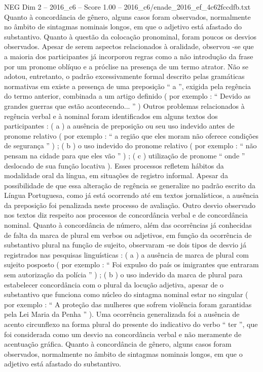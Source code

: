 \begin{textsample}{NEG Dim 2 – 2016\_c6 – Score 1.00 – 2016\_c6/enade\_2016\_ef\_4c62fccdfb.txt}
Quanto à concordância de gênero, alguns casos foram observados, normalmente no âmbito de sintagmas nominais longos, em que o adjetivo está afastado do substantivo.
Quanto à questão da colocação pronominal, foram poucos os desvios observados.
Apesar de serem aspectos relacionados à oralidade, observou -se que a maioria dos participantes já incorporou regras como a não introdução da frase por um pronome oblíquo e a próclise na presença de um termo atrator.
Não se adotou, entretanto, o padrão excessivamente formal descrito pelas gramáticas normativas em existe a presença de uma preposição “ a ”, exigida pela regência do termo anterior, combinada a um artigo definido ( por exemplo : “ Devido as grandes guerras que estão acontecendo... ” ) Outros problemas relacionados à regência verbal e à nominal foram identificados em alguns textos dos participantes : ( a ) a ausência de preposição ou seu uso indevido antes de pronome relativo ( por exemplo : “ a região que eles moram não oferece condições de segurança ” ) ; ( b ) o uso indevido do pronome relativo ( por exemplo : “ não pensam na cidade para que eles vão ” ) ; ( c ) utilização de pronome “ onde ” deslocado de sua função locativa ).
Esses processos refletem hábitos da modalidade oral da língua, em situações de registro informal.
Apesar da possibilidade de que essa alteração de regência se generalize no padrão escrito da Língua Portuguesa, como já está ocorrendo até em textos jornalísticos, a ausência da preposição foi penalizada neste processo de avaliação.
Outro desvio observado nos textos diz respeito aos processos de concordância verbal e de concordância nominal.
Quanto à concordância de número, além das ocorrências já conhecidas de falta da marca de plural em verbos ou adjetivos, em função da ocorrência de substantivo plural na função de sujeito, observaram -se dois tipos de desvio já registrados nas pesquisas linguísticas : ( a ) a ausência de marca de plural com sujeito posposto ( por exemplo : “ Foi expulso do país os imigrantes que entraram sem autorização da polícia ” ) ; ( b ) o uso indevido da marca de plural para estabelecer concordância com o plural da locução adjetiva, apesar de o substantivo que funciona como núcleo do sintagma nominal estar no singular ( por exemplo : “ A proteção das mulheres que sofrem violência foram garantidas pela Lei Maria da Penha ” ).
Uma ocorrência generalizada foi a ausência de acento circunflexo na forma plural do presente do indicativo do verbo “ ter ”, que foi considerada como um desvio na concordância verbal e não meramente de acentuação gráfica.
Quanto à concordância de gênero, alguns casos foram observados, normalmente no âmbito de sintagmas nominais longos, em que o adjetivo está afastado do substantivo.

\end{textsample}
